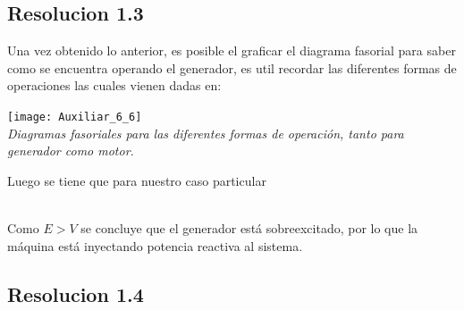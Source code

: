 \documentclass[
  11pt,
  letterpaper,
   addpoints,
   answers
  ]{exam}
\begin{document}
\begin{questions}
\begin{solution}
\subsection*{Resolucion 1.3}
Una vez obtenido lo anterior, es posible el graficar el diagrama fasorial para saber como se encuentra operando el generador, es util recordar las diferentes formas de operaciones las cuales vienen dadas en:
\begin{center}
    \texttt{[image: Auxiliar\_6\_6]} \\
    \textit{Diagramas fasoriales para las diferentes formas de operación, tanto para generador como motor.}
\end{center}
Luego se tiene que para nuestro caso particular\\\\
\begin{center}
\end{center}
    \vspace{0.5cm}
    
    Como $E > V$ se concluye que el generador está sobreexcitado, por lo que la máquina está inyectando potencia reactiva al sistema.
    \subsection*{Resolucion 1.4}


\end{solution}
\end{questions}
\end{document}

